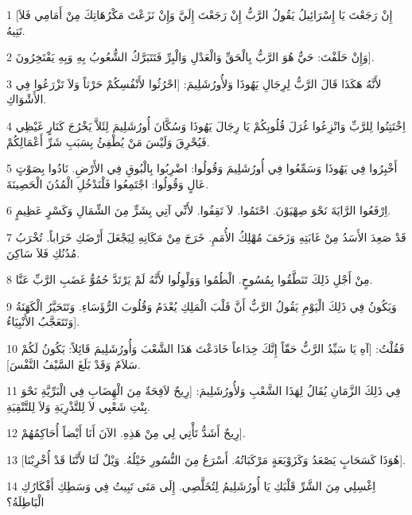 \par 1 [إِنْ رَجَعْتَ يَا إِسْرَائِيلُ يَقُولُ الرَّبُّ إِنْ رَجَعْتَ إِلَيَّ وَإِنْ نَزَعْتَ مَكْرُهَاتِكَ مِنْ أَمَامِي فَلاَ تَتِيهُ.
\par 2 وَإِنْ حَلَفْتَ: حَيٌّ هُوَ الرَّبُّ بِالْحَقِّ وَالْعَدْلِ وَالْبِرِّ فَتَتَبَرَّكُ الشُّعُوبُ بِهِ وَبِهِ يَفْتَخِرُونَ].
\par 3 لأَنَّهُ هَكَذَا قَالَ الرَّبُّ لِرِجَالِ يَهُوذَا وَلأُورُشَلِيمَ: [احْرُثُوا لأَنْفُسِكُمْ حَرْثاً وَلاَ تَزْرَعُوا فِي الأَشْوَاكِ.
\par 4 اِخْتَتِنُوا لِلرَّبِّ وَانْزِعُوا غُرَلَ قُلُوبِكُمْ يَا رِجَالَ يَهُوذَا وَسُكَّانَ أُورُشَلِيمَ لِئَلاَّ يَخْرُجَ كَنَارٍ غَيْظِي فَيُحْرِقَ وَلَيْسَ مَنْ يُطْفِئُ بِسَبَبِ شَرِّ أَعْمَالِكُمْ.
\par 5 أَخْبِرُوا فِي يَهُوذَا وَسَمِّعُوا فِي أُورُشَلِيمَ وَقُولُوا: اضْرِبُوا بِالْبُوقِ فِي الأَرْضِ. نَادُوا بِصَوْتٍ عَالٍ وَقُولُوا: اجْتَمِعُوا فَلْنَدْخُلِ الْمُدُنَ الْحَصِينَةَ.
\par 6 اِرْفَعُوا الرَّايَةَ نَحْوَ صِهْيَوْنَ. احْتَمُوا. لاَ تَقِفُوا. لأَنِّي آتِي بِشَرٍّ مِنَ الشِّمَالِ وَكَسْرٍ عَظِيمٍ.
\par 7 قَدْ صَعِدَ الأَسَدُ مِنْ غَابَتِهِ وَزَحَفَ مُهْلِكُ الأُمَمِ. خَرَجَ مِنْ مَكَانِهِ لِيَجْعَلَ أَرْضَكِ خَرَاباً. تُخْرَبُ مُدُنُكِ فَلاَ سَاكِنَ.
\par 8 مِنْ أَجْلِ ذَلِكَ تَنَطَّقُوا بِمُسُوحٍ. الْطُمُوا وَوَلْوِلُوا لأَنَّهُ لَمْ يَرْتَدَّ حُمُوُّ غَضَبِ الرَّبِّ عَنَّا.
\par 9 وَيَكُونُ فِي ذَلِكَ الْيَوْمِ يَقُولُ الرَّبُّ أَنَّ قَلْبَ الْمَلِكِ يُعْدَمُ وَقُلُوبَ الرُّؤَسَاءِ. وَتَتَحَيَّرُ الْكَهَنَةُ وَتَتَعَجَّبُ الأَنْبِيَاءُ].
\par 10 فَقُلْتُ: [آهِ يَا سَيِّدُ الرَّبُّ حَقّاً إِنَّكَ خِدَاعاً خَادَعْتَ هَذَا الشَّعْبَ وَأُورُشَلِيمَ قَائِلاً: يَكُونُ لَكُمْ سَلاَمٌ وَقَدْ بَلَغَ السَّيْفُ النَّفْسَ].
\par 11 فِي ذَلِكَ الزَّمَانِ يُقَالُ لِهَذَا الشَّعْبِ وَلأُورُشَلِيمَ: [رِيحٌ لاَفِحَةٌ مِنَ الْهَِضَابِ فِي الْبَرِّيَّةِ نَحْوَ بِنْتِ شَعْبِي لاَ لِلتَّذْرِيَةِ وَلاَ لِلتَّنْقِيَةِ.
\par 12 رِيحٌ أَشَدُّ تَأْتِي لِي مِنْ هَذِهِ. الآنَ أَنَا أَيْضاً أُحَاكِمُهُمْ].
\par 13 [هُوَذَا كَسَحَابٍ يَصْعَدُ وَكَزَوْبَعَةٍ مَرْكَبَاتُهُ. أَسْرَعُ مِنَ النُّسُورِ خَيْلُهُ. وَيْلٌ لَنَا لأَنَّنَا قَدْ أُخْرِبْنَا].
\par 14 اِغْسِلِي مِنَ الشَّرِّ قَلْبَكِ يَا أُورُشَلِيمُ لِتُخَلَّصِي. إِلَى مَتَى تَبِيتُ فِي وَسَطِكِ أَفْكَارُكِ الْبَاطِلَةُ؟
